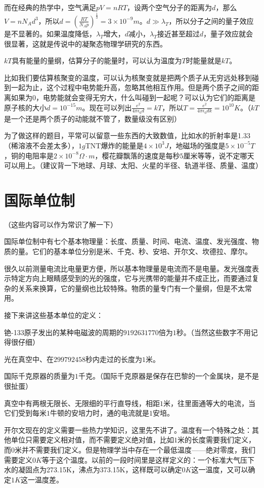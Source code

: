 而在经典的热学中，空气满足$p V=n R T$，设两个空气分子的距离为$d$，那么$V=n N_A d^3$，所以$d=(\frac{R T}{N_A p})^{\frac{1}{3}}=3 \times 10^{-9} \unit{m}$。$d \gg \lambda_T$，所以分子之间的量子效应是不显著的。如果温度降低，$\lambda_T$增大，$d$减小，$\lambda_T$接近甚至超过$d$，量子效应就会很显著，这就是传说中的凝聚态物理学研究的东西。

$k T$具有能量的量纲，估算分子的能量时，可以认为温度为$T$时能量就是$k T$。

比如我们要估算核聚变的温度，可以认为核聚变就是把两个质子从无穷远处移到碰到一起为止，这个过程中电势能升高，忽略其他相互作用。但是两个质子之间的距离如果为$0$，电势能就会变得无穷大，什么叫碰到一起呢？可以认为它们的距离是原子核的大小$d=10^{-15} \unit{m}$。现在可以列出$\frac{e^2}{4 \pi \epsilon_0 d}=k T$，所以$T=\frac{e^2}{4 \pi \epsilon_0 d k}=10^{10} \unit{K}$。（$k T$是一个还是两个质子的动能就不管了，数量级没有区别）

为了做这样的题目，平常可以留意一些东西的大致数值，比如水的折射率是1.33（稀溶液不会差太多），$1 \unit{g}$TNT爆炸的能量是$4 \times 10^3 \unit{J}$，地磁场的强度是$5 \times 10^{-5} \unit{T}$，铜的电阻率是$2 \times 10^{-8} \unit{\Omega \cdot m}$，樱花瓣飘落的速度是每秒$5$厘米等等，说不定哪天可以用上。（建议背一下地球、月球、太阳、火星的半径、轨道半径、质量、温度）
\section{国际单位制}
（这些内容可以作为常识了解一下）

国际单位制中有七个基本物理量：长度、质量、时间、电流、温度、发光强度、物质的量。它们的基本单位分别是米、千克、秒、安培、开尔文、坎德拉、摩尔。

很久以前测量电流比电量更方便，所以基本物理量是电流而不是电量。发光强度表示特定方向上眼睛感受到的光的强度，它与光携带的能量并不成正比，而要通过复杂的关系来换算，它的量纲也比较特殊。物质的量专门有一个量纲，但是不太常用。

接下来讲这些基本单位的定义：

铯-133原子发出的某种电磁波的周期的$9192631770$倍为$1$秒。（当然这些数字不用记得很仔细）

光在真空中、在$299792458$秒内走过的长度为$1$米。

国际千克原器的质量为$1$千克。（国际千克原器是保存在巴黎的一个金属块，是不是很扯蛋）

真空中有两根无限长、无限细的平行直导线，相距$1$米，往里面通等大的电流，当它们受到每米$1$牛顿的安培力时，通的电流就是$1$安培。

开尔文现在的定义需要一些热力学知识，这里先不讲了。温度有一个特殊之处：其他单位只需要定义相对值，而不需要定义绝对值，比如$1$米的长度需要我们定义，而$0$米并不需要我们定义。但是物理学当中存在一个最低温度——绝对零度，我们需要定义$0 \unit{K}$等于这个温度。以前的一段时间里是这样定义的：一个标准大气压下水的凝固点为273.15K，沸点为373.15K，这样既可以确定$0 \unit{K}$这一温度，又可以确定$1 \unit{K}$这一温度差。

